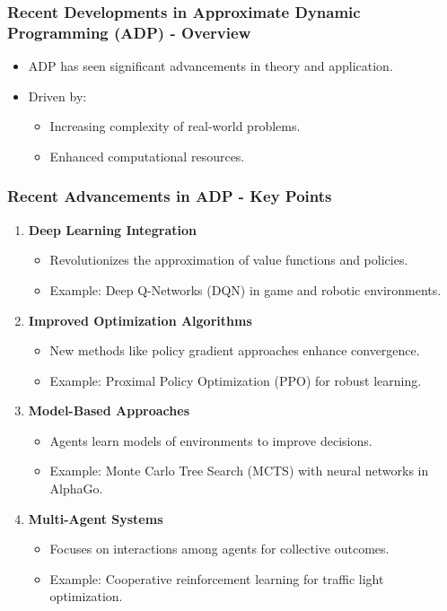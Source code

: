 \documentclass[aspectratio=169]{beamer}
\begin{document}
\begin{frame}[fragile]
    \frametitle{Recent Developments in Approximate Dynamic Programming (ADP) - Overview}
    \begin{itemize}
        \item ADP has seen significant advancements in theory and application.
        \item Driven by:
        \begin{itemize}
            \item Increasing complexity of real-world problems.
            \item Enhanced computational resources.
        \end{itemize}
    \end{itemize}
\end{frame}

\begin{frame}[fragile]
    \frametitle{Recent Advancements in ADP - Key Points}
    \begin{enumerate}
        \item \textbf{Deep Learning Integration}
        \begin{itemize}
            \item Revolutionizes the approximation of value functions and policies.
            \item Example: Deep Q-Networks (DQN) in game and robotic environments.
        \end{itemize}

        \item \textbf{Improved Optimization Algorithms}
        \begin{itemize}
            \item New methods like policy gradient approaches enhance convergence.
            \item Example: Proximal Policy Optimization (PPO) for robust learning.
        \end{itemize}

        \item \textbf{Model-Based Approaches}
        \begin{itemize}
            \item Agents learn models of environments to improve decisions.
            \item Example: Monte Carlo Tree Search (MCTS) with neural networks in AlphaGo.
        \end{itemize}

        \item \textbf{Multi-Agent Systems}
        \begin{itemize}
            \item Focuses on interactions among agents for collective outcomes.
            \item Example: Cooperative reinforcement learning for traffic light optimization.
        \end{itemize}
    \end{enumerate}
\end{frame}
\end{document}
